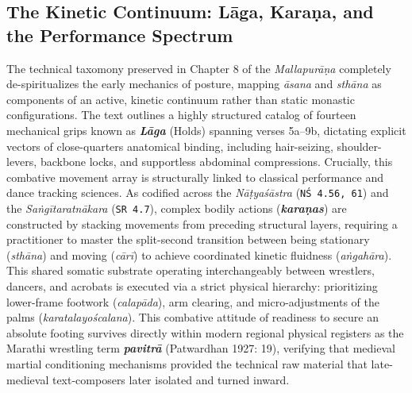 \documentclass[11pt,letterpaper]{article}
\begin{document}
\subsection{The Kinetic Continuum: Lāga, Karaṇa, and the Performance Spectrum}
The technical taxomony preserved in Chapter 8 of the \textit{Mallapurāṇa} completely de-spiritualizes the early mechanics of posture, mapping \textit{āsana} and \textit{sthāna} as components of an active, kinetic continuum rather than static monastic configurations. The text outlines a highly structured catalog of fourteen mechanical grips known as \textbf{\textit{Lāga}} (Holds) spanning verses 5a--9b, dictating explicit vectors of close-quarters anatomical binding, including hair-seizing, shoulder-levers, backbone locks, and supportless abdominal compressions. Crucially, this combative movement array is structurally linked to classical performance and dance tracking sciences. As codified across the \textit{Nāṭyaśāstra} (\texttt{NŚ 4.56, 61}) and the \textit{Saṅgītaratnākara} (\texttt{SR 4.7}), complex bodily actions (\textbf{\textit{karaṇas}}) are constructed by stacking movements from preceding structural layers, requiring a practitioner to master the split-second transition between being stationary (\textit{sthāna}) and moving (\textit{cārī}) to achieve coordinated kinetic fluidness (\textit{aṅgahāra}). This shared somatic substrate operating interchangeably between wrestlers, dancers, and acrobats is executed via a strict physical hierarchy: prioritizing lower-frame footwork (\textit{calapāda}), arm clearing, and micro-adjustments of the palms (\textit{karatalayoścalana}). This combative attitude of readiness to secure an absolute footing survives directly within modern regional physical registers as the Marathi wrestling term \textbf{\textit{pavitrā}} (Patwardhan 1927: 19), verifying that medieval martial conditioning mechanisms provided the technical raw material that late-medieval text-composers later isolated and turned inward.
\end{document}

